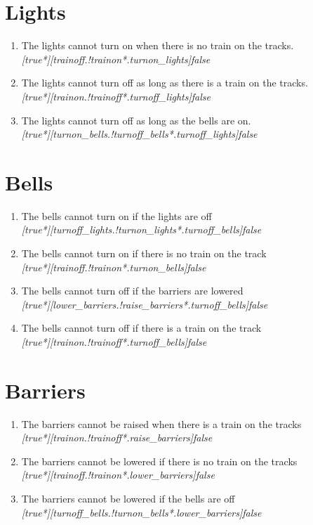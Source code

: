 \documentclass[final]{report}
\begin{document}
\section{Lights}

\begin{enumerate}
\item The lights cannot turn on when there is no train on the tracks.\\
\textit{[true*][trainoff.!trainon*.turnon\_lights]false}

\item The lights cannot turn off as long as there is a train on the tracks.\\
\textit{[true*][trainon.!trainoff*.turnoff\_lights]false}

\item The lights cannot turn off as long as the bells are on.\\
\textit{[true*][turnon\_bells.!turnoff\_bells*.turnoff\_lights]false}
\end{enumerate}

\section{Bells}
\begin{enumerate}
\item The bells cannot turn on if the lights are off\\
\textit{[true*][turnoff\_lights.!turnon\_lights*.turnoff\_bells]false}
\item The bells cannot turn on if there is no train on the track\\
\textit{[true*][trainoff.!trainon*.turnon\_bells]false}
\item The bells cannot turn off if the barriers are lowered\\
\textit{[true*][lower\_barriers.!raise\_barriers*.turnoff\_bells]false}
\item The bells cannot turn off if there is a train on the track\\
\textit{[true*][trainon.!trainoff*.turnoff\_bells]false}
\end{enumerate}

\section{Barriers}
\begin{enumerate}
\item The barriers cannot be raised when there is a train on the tracks\\
\textit{[true*][trainon.!trainoff*.raise\_barriers]false}
\item The barriers cannot be lowered if there is no train on the tracks\\
\textit{[true*][trainoff.!trainon*.lower\_barriers]false}
\item The barriers cannot be lowered if the bells are off\\
\textit{[true*][turnoff\_bells.!turnon\_bells*.lower\_barriers]false}
\end{enumerate}
\end{document}
